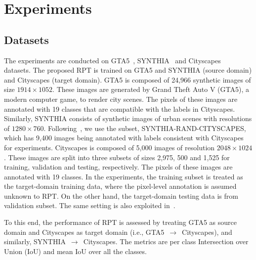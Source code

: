 \documentclass[10pt,twocolumn,letterpaper]{article}
\begin{document}
\vspace{-0.1in}
\section{Experiments}
\vspace{-0.05in}
\subsection{Datasets}
\vspace{-0.05in}
The experiments are conducted on GTA5~\cite{GTA5_richter2016playing}, SYNTHIA~\cite{ros2016synthia} and Cityscapes~\cite{Cordts2016Cityscapes} datasets. The proposed RPT is trained on GTA5 and SYNTHIA (source domain) and Cityscapes (target domain). GTA5 is composed of 24,966 synthetic images of size $1914 \times 1052$. These images are generated by Grand Theft Auto V (GTA5), a modern computer game, to render city scenes. The pixels of these images are annotated with 19 classes that are compatible with the labels in Cityscapes. Similarly, SYNTHIA consists of synthetic images of urban scenes with resolutions of $1280 \times 760$. Following~\cite{chang2019all,chen2019learning,hong2018conditional,li2019bidirectional,Tsai_2018_CVPR}, we use the subset, SYNTHIA-RAND-CITYSCAPES, which has 9,400 images being annotated with labels consistent with Cityscapes for experiments. Cityscapes is composed of 5,000 images of resolution $2048 \times 1024$. These images are split into three subsets of sizes 2,975, 500 and 1,525 for training, validation and testing, respectively. The pixels of these images are annotated with 19 classes. In the experiments, the training subset is treated as the target-domain training data, where the pixel-level annotation is assumed unknown to RPT. On the other hand, the target-domain testing data is from validation subset. The same setting is also exploited in~\cite{chang2019all,li2019bidirectional,Tsai_2018_CVPR}.

To this end, the performance of RPT is assessed by treating GTA5 as source domain and Cityscapes as target domain (i.e., GTA5~$\to$~Cityscapes), and similarly, SYNTHIA~$\to$~Cityscapes. The metrics are per class Intersection over Union (IoU) and mean IoU over all the classes.
\end{document}
